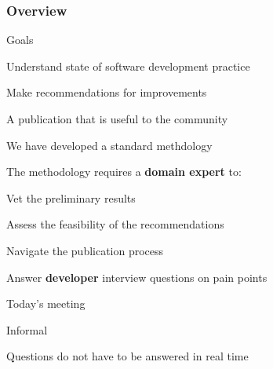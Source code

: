 \documentclass[t,12pt,numbers,fleqn]{beamer}
\begin{document}





\begin{frame}
\frametitle{Overview}

\bi
\item Goals
  \bi
  \item Understand state of software development practice
  \item Make recommendations for improvements
  \item A publication that is useful to the community
  \ei  
\item We have developed a standard methdology%
\item The methodology requires a \textbf{domain expert} to:
  \bi
  \item Vet the preliminary results
  \item Assess the feasibility of the recommendations
  \item Navigate the publication process
  \item Answer \textbf{developer} interview questions on pain points  
  \ei
\item Today's meeting
  \bi
\item Informal
\item Questions do not have to be answered in real time%
  \ei
\ei

\end{frame}

\end{document}
